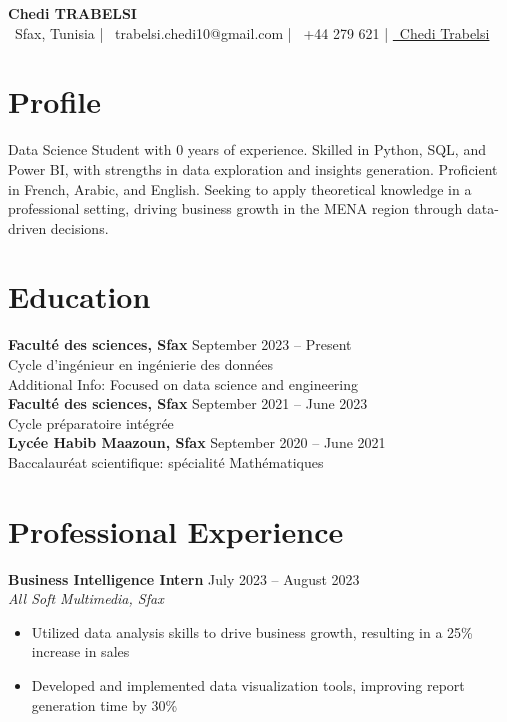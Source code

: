 \documentclass[9pt]{article}
\begin{document}
\begin{center}
    {\Large \textbf{Chedi TRABELSI}}\\[0.3em]
    \faMapMarker\ Sfax, Tunisia | \quad
    \faEnvelope~trabelsi.chedi10@gmail.com \quad | \quad 
    \faPhone*~+44 279 621 \quad |
    \href{https://www.linkedin.com/in/cheditrabelsi}{\raisebox{-0.05\height} \faLinkedin\ Chedi Trabelsi}
\end{center}
\vspace{0.2em}

\section*{Profile}
Data Science Student with 0 years of experience. Skilled in Python, SQL, and Power BI, with strengths in data exploration and insights generation. Proficient in French, Arabic, and English. Seeking to apply theoretical knowledge in a professional setting, driving business growth in the MENA region through data-driven decisions.

\section*{Education}
\textbf{Faculté des sciences, Sfax} \hfill September 2023 -- Present \\
Cycle d'ingénieur en ingénierie des données \\
Additional Info: Focused on data science and engineering \\
\textbf{Faculté des sciences, Sfax} \hfill September 2021 -- June 2023 \\
Cycle préparatoire intégrée \\
\textbf{Lycée Habib Maazoun, Sfax} \hfill September 2020 -- June 2021 \\
Baccalauréat scientifique: spécialité Mathématiques

\section*{Professional Experience}
\textbf{Business Intelligence Intern} \hfill July 2023 -- August 2023 \\
\textit{\small All Soft Multimedia, Sfax} \vspace{-2mm}
\begin{itemize}[itemsep=-0.2em] 
    \item Utilized data analysis skills to drive business growth, resulting in a 25\% increase in sales
    \item Developed and implemented data visualization tools, improving report generation time by 30\%
\end{itemize}
\vspace{1mm}
\end{document}

